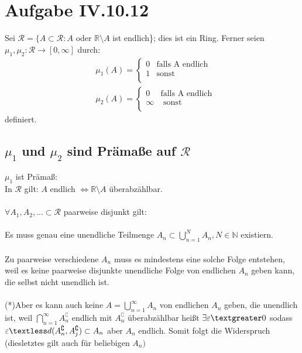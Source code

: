 \documentclass[12pt,a4paper]{article}
\begin{document}
\pagestyle{fancy}
\fancyhf{}
\rfoot{\thepage}

\section{Aufgabe IV.10.12}
Sei $\mathscr{R} = \{ A \subset \mathscr{R}: A$ oder $\mathbb{R}  \setminus A$ ist endlich\}; dies ist ein Ring. Ferner seien $\mu_1,  \mu_2: \mathscr{R} \rightarrow [0,\infty]$ durch:
\begin{align*}
&\mu_1(A) =  \left\{
	\begin{array}{ll}
     	0 & \text{falls A endlich} \\
      	1 & \text{sonst} \\
	\end{array} 
	\right. \\
&\mu_2(A) =   \left\{
	\begin{array}{ll}
      	0 & \text{falls A endlich} \\
      	\infty & \text{ sonst} \\
	\end{array} 
	\right. 	
\end{align*}
definiert. 
\subsection{$\mu_1$ und $\mu_2$ sind Prämaße auf $\mathscr{R}$}
$\mu_1$ ist Prämaß:\\
In $\mathscr{R}$ gilt: 
$A$ endlich $\iff \mathbb{R} \setminus{A}$ überabzählbar. \\\\
$ \forall A_1, A_2,... \subset \mathscr{R}$ paarweise disjunkt gilt: \\\\
Es muss genau eine unendliche Teilmenge $A_n \subset \bigcup_{n=1}^{N}A_n,N \in \mathbb{N}$ existiern. \\\\ 
Zu paarweise verschiedene $A_n$ muss es mindestens eine solche Folge entstehen, weil es keine paarweise disjunkte unendliche Folge von endlichen $A_n$ geben kann, die selbst nicht unendlich ist.\\\\
(*)Aber es kann auch keine $A = \bigcup_{n=1}^{\infty} A_n$ von endlichen $A_n$ geben, die  unendlich ist, weil $\bigcap_{n=1}^{\infty} A_n^\complement$ endlich mit $A_n^\complement$ überabzählbar heißt $\exists \varepsilon \textgreater 0$ sodass $\varepsilon \textless d(A_n^\complement, A_j^\complement) \subset A_n$ aber $ A_n$ endlich. Somit folgt die Widerspruch (diesletztes gilt auch für beliebigen $A_n)$\\
\end{document}
